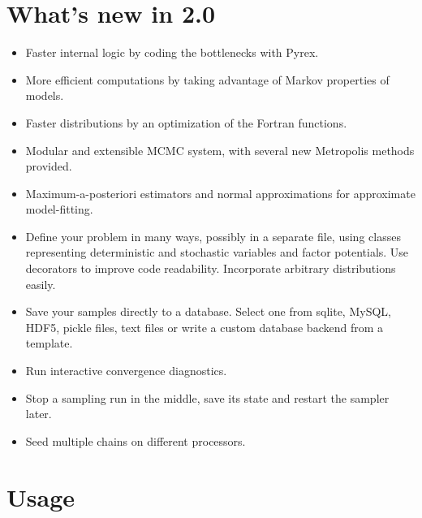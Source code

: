 \section*{What's new in 2.0}
\label{what-s-new-in-2-0}
\begin{itemize}
\item {} 
Faster internal logic by coding the bottlenecks with Pyrex.

\item {}
More efficient computations by taking advantage of Markov properties of models.

\item {} 
Faster distributions by an optimization of the Fortran functions.

\item {} 
Modular and extensible MCMC system, with several new Metropolis methods provided.

\item {}
Maximum-a-posteriori estimators and normal approximations for approximate model-fitting.

\item {} 
Define your problem in many ways, possibly in a separate file, using classes representing deterministic and stochastic variables and factor potentials. Use decorators to improve code readability. Incorporate arbitrary distributions easily.

\item {} 
Save your samples directly to a database. Select one from sqlite, MySQL, HDF5,
pickle files, text files or write a custom database backend from a template.

\item {} 
Run interactive convergence diagnostics.

\item {} 
Stop a sampling run in the middle, save its state and restart the sampler
later.

\item {} 
Seed multiple chains on different processors.

\end{itemize}



\hypertarget{usage}{}
\section*{Usage}
\label{usage}

